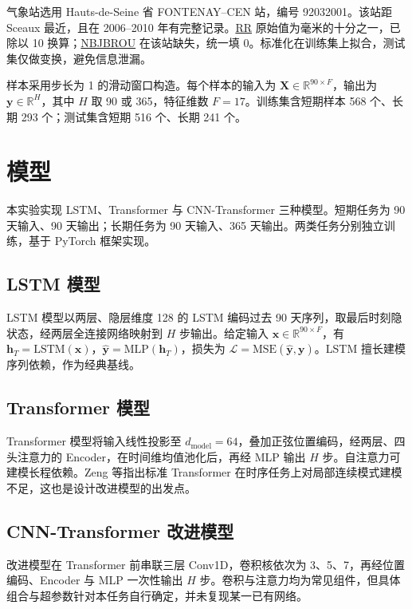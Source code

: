 \documentclass[UTF8,a4paper,12pt]{ctexart}
\newcommand{\varname}[1]{\url{#1}}
\begin{document}
气象站选用 Hauts-de-Seine 省 FONTENAY--CEN 站，编号 92032001。该站距 Sceaux 最近，且在 2006--2010 年有完整记录。\varname{RR} 原始值为毫米的十分之一，已除以 10 换算；\varname{NBJBROU} 在该站缺失，统一填 0。标准化在训练集上拟合，测试集仅做变换，避免信息泄漏。

样本采用步长为 1 的滑动窗口构造\cite{window1,window2,window3}。每个样本的输入为 $\mathbf{X} \in \mathbb{R}^{90 \times F}$，输出为 $\mathbf{y} \in \mathbb{R}^{H}$，其中 $H$ 取 90 或 365，特征维数 $F=17$。训练集含短期样本 568 个、长期 293 个；测试集含短期 516 个、长期 241 个。

\section{模型}

本实验实现 LSTM、Transformer 与 CNN-Transformer 三种模型。短期任务为 90 天输入、90 天输出；长期任务为 90 天输入、365 天输出。两类任务分别独立训练，基于 PyTorch 框架实现。

\subsection{LSTM 模型}

LSTM 模型以两层、隐层维度 128 的 LSTM 编码过去 90 天序列，取最后时刻隐状态，经两层全连接网络映射到 $H$ 步输出。给定输入 $\mathbf{x} \in \mathbb{R}^{90 \times F}$，有 $\mathbf{h}_T = \mathrm{LSTM}(\mathbf{x})$，$\hat{\mathbf{y}} = \mathrm{MLP}(\mathbf{h}_T)$，损失为 $\mathcal{L} = \mathrm{MSE}(\hat{\mathbf{y}}, \mathbf{y})$。LSTM 擅长建模序列依赖\cite{lstm}，作为经典基线。

\subsection{Transformer 模型}

Transformer 模型将输入线性投影至 $d_{\mathrm{model}}=64$，叠加正弦位置编码，经两层、四头注意力的 Encoder，在时间维均值池化后，再经 MLP 输出 $H$ 步。自注意力可建模长程依赖\cite{transformer}。Zeng 等\cite{zeng2023}指出标准 Transformer 在时序任务上对局部连续模式建模不足，这也是设计改进模型的出发点。

\subsection{CNN-Transformer 改进模型}

改进模型在 Transformer 前串联三层 Conv1D，卷积核依次为 3、5、7，再经位置编码、Encoder 与 MLP 一次性输出 $H$ 步。卷积与注意力均为常见组件，但具体组合与超参数针对本任务自行确定，并未复现某一已有网络。
\end{document}

